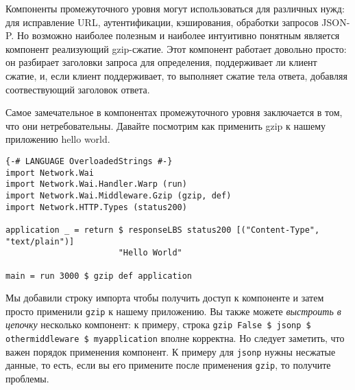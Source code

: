 Компоненты промежуточного уровня могут использоваться для различных нужд: для исправление URL,
аутентификации, кэширования, обработки запросов JSON-P. Но возможно наиболее полезным
и наиболее интуитивно понятным является компонент реализующий gzip-сжатие. Этот компонент работает
довольно просто: он разбирает заголовки запроса для определения, поддерживает ли клиент
сжатие, и, если клиент поддерживает, то выполняет сжатие тела ответа, добавляя соотвествующий
заголовок ответа.

Самое замечательное в компонентах промежуточного уровня заключается в том, что они нетребовательны. Давайте посмотрим
как применить gzip к нашему приложению hello world.

\begin{lstlisting}
{-# LANGUAGE OverloadedStrings #-}
import Network.Wai
import Network.Wai.Handler.Warp (run)
import Network.Wai.Middleware.Gzip (gzip, def)
import Network.HTTP.Types (status200)

application _ = return $ responseLBS status200 [("Content-Type", "text/plain")]
                       "Hello World"

main = run 3000 $ gzip def application
\end{lstlisting}%

Мы добавили строку импорта чтобы получить доступ к компоненте и затем просто применили \lstinline!gzip!
к нашему приложению. Вы также можете \emph{выстроить в цепочку} несколько компонент:
к примеру, строка \lstinline{gzip False $ jsonp $ othermiddleware $ myapplication}
вполне корректна. Но следует заметить, что важен порядок применения компонент. К примеру
для \lstinline!jsonp! нужны несжатые данные, то есть, если вы его примените после применения \lstinline!gzip!,
то получите проблемы.

